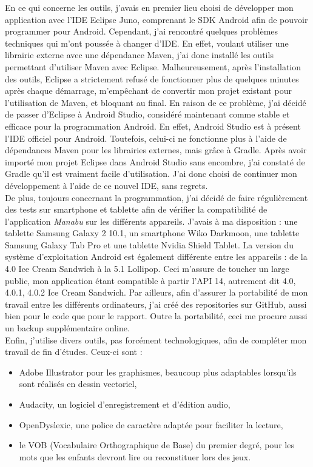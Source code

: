 En ce qui concerne les outils, j'avais en premier lieu choisi de développer mon application avec l'IDE Eclipse Juno, comprenant le SDK Android afin de pouvoir programmer pour Android. Cependant, j'ai rencontré quelques problèmes techniques qui m'ont poussée à changer d'IDE. En effet, voulant utiliser une librairie externe avec une dépendance Maven, j'ai donc installé les outils permettant d'utiliser Maven avec Eclipse. Malheureusement, après l'installation des outils, Eclipse a strictement refusé de fonctionner plus de quelques minutes après chaque démarrage, m'empêchant de convertir mon projet existant pour l'utilisation de Maven, et bloquant au final. En raison de ce problème, j'ai décidé de passer d'Eclipse à Android Studio, considéré maintenant comme stable et efficace pour la programmation Android. En effet, Android Studio est à présent l'IDE officiel pour Android. Toutefois, celui-ci ne fonctionne plus à l'aide de dépendances Maven pour les librairies externes, mais grâce à Gradle. Après avoir importé mon projet Eclipse dans Android Studio sans encombre, j'ai constaté de Gradle qu'il est vraiment facile d'utilisation. J'ai donc choisi de continuer mon développement à l'aide de ce nouvel IDE, sans regrets.\\

De plus, toujours concernant la programmation, j'ai décidé de faire régulièrement des tests sur smartphone et tablette afin de vérifier la compatibilité de l'application \textit{Manabu} sur les différents appareils. J'avais à ma disposition : une tablette Samsung Galaxy 2 10.1, un smartphone Wiko Darkmoon, une tablette Samsung Galaxy Tab Pro et une tablette Nvidia Shield Tablet. La version du système d'exploitation Android est également différente entre les appareils : de la 4.0 Ice Cream Sandwich à la 5.1 Lollipop. Ceci m'assure de toucher un large public, mon application étant compatible à partir l'API 14, autrement dit 4.0, 4.0.1, 4.0.2 Ice Cream Sandwich. Par ailleurs, afin d'assurer la portabilité de mon travail entre les différents ordinateurs, j'ai créé des repositories sur GitHub, aussi bien pour le code que pour le rapport. Outre la portabilité, ceci me procure aussi un backup supplémentaire online.\\

Enfin, j'utilise divers outils, pas forcément technologiques, afin de compléter mon travail de fin d'études. Ceux-ci sont :
\begin{itemize}
\item Adobe Illustrator pour les graphismes, beaucoup plus adaptables lorsqu'ils sont réalisés en dessin vectoriel,
\item Audacity, un logiciel d'enregistrement et d'édition audio,
\item OpenDyslexic, une police de caractère adaptée pour faciliter la lecture,
\item le VOB (Vocabulaire Orthographique de Base) du premier degré, pour les mots que les enfants devront lire ou reconstituer lors des jeux.
\end{itemize} 



